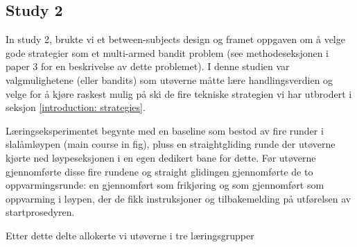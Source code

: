  \subsection{Study 2}
In study 2, brukte vi et between-subjects design og framet oppgaven om å velge gode strategier som et multi-armed bandit problem \cite{sutton_reinforcement_2018} (see methodeseksjonen i paper 3 for en beskrivelse av dette problemet). I denne studien var valgmulighetene (eller bandits) som utøverne måtte lære handlingsverdien og velge for å kjøre raskest mulig på ski de fire tekniske strategien vi har utbrodert i seksjon \ref{introduction: strategies}. 

Læringseksperimentet begynte med en baseline som bestod av fire runder i slalåmløypen (main course in fig), pluss en straightgliding runde der utøverne kjørte ned løypeseksjonen i en egen dedikert bane for dette. Før utøverne gjennomførte disse fire rundene og straight glidingen gjennomførte de to oppvarmingsrunde: en gjennomført som frikjøring og som gjennomført som oppvarming i løypen, der de fikk instruksjoner og tilbakemelding på utførelsen av startprosedyren. 

Etter dette delte allokerte vi utøverne i tre læringsgrupper








































